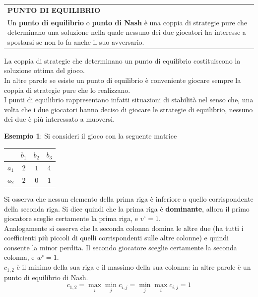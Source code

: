\documentclass[a4paper]{extarticle}
\renewcommand\arraystretch{}
\begin{document}
\vspace{1em}
\setlength{\tabcolsep}{14pt}
\renewcommand{\arraystretch}{2}
\noindent
\begin{tabularx}{\textwidth}{@{}|P|@{}}
    \hline
    {\textbf{PUNTO DI EQUILIBRIO}}\\
    \parbox{\linewidth}{Un \textbf{punto di equilibrio} o \textbf{punto di Nash} è una coppia di strategie pure che determinano una soluzione nella quale nessuno dei due giocatori ha interesse a spostarsi se non lo fa anche il suo avversario.\vspace{3mm}}\\
    \hline
\end{tabularx}

\vspace{1em}
\noindent
La coppia di strategie che determinano un punto di equilibrio costituiscono la soluzione ottima del gioco.\\
In altre parole se esiste un punto di equilibrio è conveniente giocare sempre la coppia di strategie pure che lo realizzano.\\
I punti di equilibrio rappresentano infatti situazioni di stabilità nel senso che, una volta che i due giocatori hanno deciso di giocare le strategie di equilibrio, nessuno dei due è più interessato a muoversi.

\vspace{1em}
\noindent
\textbf{Esempio 1}: Si consideri il gioco con la seguente matrice

\vspace{1em}
\noindent
\begin{table}[H]
    \setlength{\tabcolsep}{8pt}
    \renewcommand{\arraystretch}{1.5}
    \noindent
    \centering
    \begin{tabular}{|c|ccc|}
        \hline
         & $b_1$ & $b_2$ & $b_3$\\
        \hline
        $a_1$ & $2$ & $1$ & $4$\\
        $a_2$ & $2$ & $0$ & $1$\\
        \hline
    \end{tabular}
\end{table}

\vspace{1em}
\noindent
Si osserva che nessun elemento della prima riga è inferiore a quello corrispondente della seconda riga. Si dice quindi che la prima riga è \textbf{dominante}, allora il primo giocatore sceglie certamente la prima riga, e $v^\circ=1$.\\
Analogamente si osserva che la seconda colonna domina le altre due (ha tutti i coefficienti più piccoli di quelli corrispondenti sulle altre colonne) e quindi consente la minor perdita. Il secondo giocatore sceglie certamente la seconda colonna, e $w^\circ = 1$.\\
$c_{1,2}$ è il minimo della sua riga e il massimo della sua colonna: in altre parole è un punto di equilibrio di Nash.
\[c_{1,2} = \underset{i}{\max} \underset{j}{\min} c_{i,j} = \underset{j}{\min} \underset{i}{\max} c_{i,j} = 1\]
\end{document}
